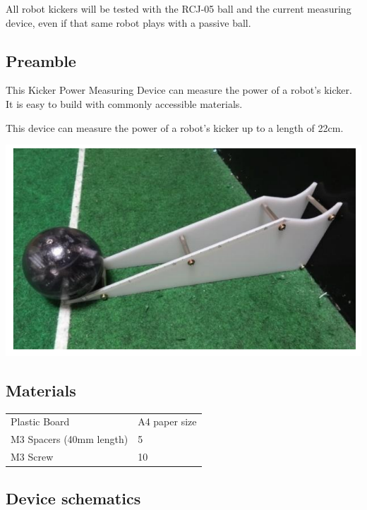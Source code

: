 \documentclass{article}
\begin{document}
All robot kickers will be tested with the RCJ-05 ball and the current measuring device, even if that same robot plays with a passive ball.

\subsection{Preamble}

This Kicker Power Measuring Device can measure the power of a robot's kicker. It is easy to build with commonly accessible materials.

This device can measure the power of a robot's kicker up to a length of 22cm.

\includegraphics[width=1\textwidth]{media/image8.png}

\subsection{Materials}

\begin{table}
\begin{tabularx}{\textwidth}{
p{}
p{}}
Plastic Board & A4 paper size \\
M3 Spacers (40mm length) & 5 \\
M3 Screw & 10 \\

\end{tabularx}

\end{table}

\subsection{Device schematics}
\end{document}
